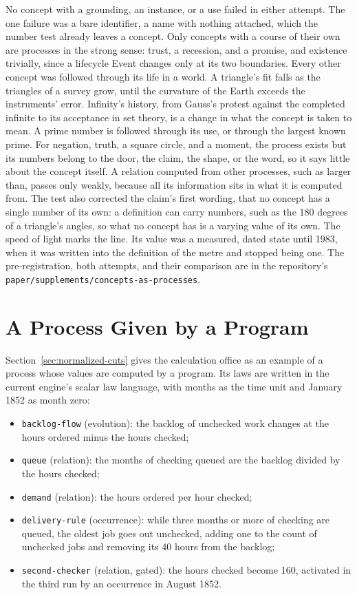 \documentclass[11pt,a4paper]{article}
\begin{document}
No concept with a grounding, an instance, or a use failed in either attempt.
The one failure was a bare identifier, a name with nothing attached, which the
number test already leaves a concept. Only concepts with a course of their own
are processes in the strong sense: trust, a recession, and a promise, and
existence trivially, since a lifecycle Event changes only at its two
boundaries. Every other concept was followed through its life in a world. A
triangle's fit falls as the triangles of a survey grow, until the curvature of
the Earth exceeds the instruments' error. Infinity's history, from Gauss's
protest against the completed infinite to its acceptance in set theory, is a
change in what the concept is taken to mean. A prime number is followed through
its use, or through the largest known prime. For negation, truth, a square
circle, and a moment, the process exists but its numbers belong to the door,
the claim, the shape, or the word, so it says little about the concept itself.
A relation computed from other processes, such as larger than, passes only
weakly, because all its information sits in what it is computed from. The test
also corrected the claim's first wording, that no concept has a single number
of its own: a definition can carry numbers, such as the 180 degrees of a
triangle's angles, so what no concept has is a varying value of its own. The
speed of light marks the line. Its value was a measured, dated state until 1983,
when it was written into the definition of the metre and stopped being one. The
pre-registration, both attempts, and their comparison are in the repository's
\texttt{paper/supplements/concepts-as-processes}.

\section{A Process Given by a Program}
\label{app:process-as-program}

Section~\ref{sec:normalized-cuts} gives the calculation office as an example of
a process whose values are computed by a program. Its laws are written in the
current engine's scalar law language, with months as the time unit and January
1852 as month zero:

\begin{itemize}
  \item \texttt{backlog-flow} (evolution): the backlog of unchecked work changes
    at the hours ordered minus the hours checked;
  \item \texttt{queue} (relation): the months of checking queued are the backlog
    divided by the hours checked;
  \item \texttt{demand} (relation): the hours ordered per hour checked;
  \item \texttt{delivery-rule} (occurrence): while three months or more of
    checking are queued, the oldest job goes out unchecked, adding one to the
    count of unchecked jobs and removing its 40 hours from the backlog;
  \item \texttt{second-checker} (relation, gated): the hours checked become 160,
    activated in the third run by an occurrence in August 1852.
\end{itemize}
\end{document}
